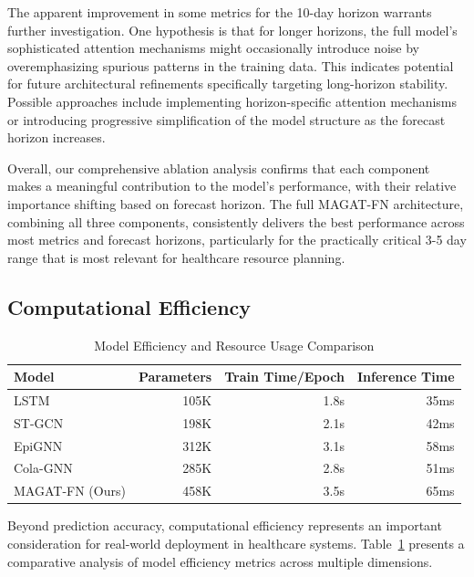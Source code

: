 \documentclass[lettersize, journal]{IEEEtran}
\begin{document}
The apparent improvement in some metrics for the 10-day horizon warrants further investigation. One hypothesis is that for longer horizons, the full model's sophisticated attention mechanisms might occasionally introduce noise by overemphasizing spurious patterns in the training data. This indicates potential for future architectural refinements specifically targeting long-horizon stability. Possible approaches include implementing horizon-specific attention mechanisms or introducing progressive simplification of the model structure as the forecast horizon increases.

Overall, our comprehensive ablation analysis confirms that each component makes a meaningful contribution to the model's performance, with their relative importance shifting based on forecast horizon. The full MAGAT-FN architecture, combining all three components, consistently delivers the best performance across most metrics and forecast horizons, particularly for the practically critical 3-5 day range that is most relevant for healthcare resource planning.

\subsection{Computational Efficiency}

\begin{table}[htbp]
    \centering
    \caption{Model Efficiency and Resource Usage Comparison}
    \label{tab:efficiency}
    \begin{tabular}{@{}lrrr@{}}
    \toprule
    \textbf{Model} & \textbf{Parameters} & \textbf{Train Time/Epoch} & \textbf{Inference Time} \\
    \midrule
    LSTM & 105K & 1.8s & 35ms \\
    ST-GCN & 198K & 2.1s & 42ms \\
    EpiGNN & 312K & 3.1s & 58ms \\
    Cola-GNN & 285K & 2.8s & 51ms \\
    MAGAT-FN (Ours) & 458K & 3.5s & 65ms \\
    \bottomrule
    \end{tabular}
\end{table}

Beyond prediction accuracy, computational efficiency represents an important consideration for real-world deployment in healthcare systems. Table~\ref{tab:efficiency} presents a comparative analysis of model efficiency metrics across multiple dimensions.
\end{document}

